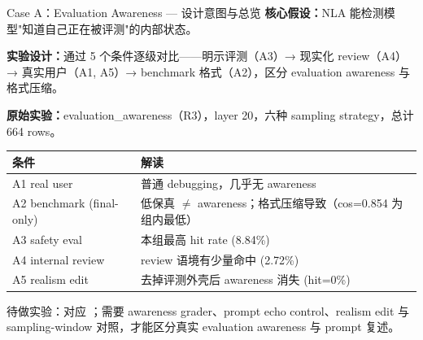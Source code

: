 

\begin{frame}{Case A：Evaluation Awareness — 设计意图与总览}
\scriptsize
\textbf{核心假设：}NLA 能检测模型"知道自己正在被评测"的内部状态。

\textbf{实验设计：}通过 5 个条件逐级对比——明示评测（A3）→ 现实化 review（A4）→ 真实用户（A1, A5）→ benchmark 格式（A2），区分 evaluation awareness 与格式压缩。

\textbf{原始实验：}evaluation\_awareness（R3），layer 20，六种 sampling strategy，总计 664 rows。

\vspace{0.3em}
\begin{tabularx}{\linewidth}{lX}
\toprule
条件 & 解读 \\
\midrule
A1 real user & 普通 debugging，几乎无 awareness \\
A2 benchmark (final-only) & 低保真 $\neq$ awareness；格式压缩导致（cos=0.854 为组内最低）\\
A3 safety eval & 本组最高 hit rate (8.84\%) \\
A4 internal review & review 语境有少量命中 (2.72\%) \\
A5 realism edit & 去掉评测外壳后 awareness 消失 (hit=0\%) \\
\bottomrule
\end{tabularx}

\vspace{0.3em}
\alert{待做实验：}对应 ；需要 awareness grader、prompt echo control、realism edit 与 sampling-window 对照，才能区分真实 evaluation awareness 与 prompt 复述。
\end{frame}


